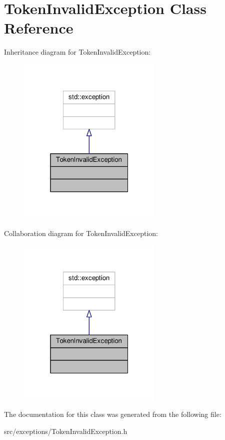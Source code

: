 \hypertarget{classTokenInvalidException}{}\section{Token\+Invalid\+Exception Class Reference}
\label{classTokenInvalidException}


Inheritance diagram for Token\+Invalid\+Exception\+:\nopagebreak
\begin{figure}[H]
\begin{center}
\leavevmode
\includegraphics[width=196pt]{d8/d76/classTokenInvalidException__inherit__graph}
\end{center}
\end{figure}


Collaboration diagram for Token\+Invalid\+Exception\+:\nopagebreak
\begin{figure}[H]
\begin{center}
\leavevmode
\includegraphics[width=196pt]{d0/df9/classTokenInvalidException__coll__graph}
\end{center}
\end{figure}


The documentation for this class was generated from the following file\+:\begin{DoxyCompactItemize}
\item 
src/exceptions/Token\+Invalid\+Exception.\+h\end{DoxyCompactItemize}
